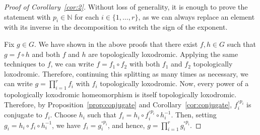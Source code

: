\documentclass[microtype]{gtpart}
\newcommand{\bn}{\mathbb N}
\theoremstyle{definition}
\numberwithin{equation}{section}
\begin{document}
\begin{proof}[Proof of Corollary~\ref{cor:2}]
Without loss of generality, it is enough to prove the statement with \( p_i \in \bn \) for each \( i \in \{1, \ldots, r\} \), as we can always replace an element with its inverse in the decomposition to switch the sign of the exponent. 

Fix \( g \in G \).
We have shown in the above proofs that there exist \( f, h \in G \) such that \( g = f\circ h \) and both \( f \) and \( h \) are topologically loxodromic. 
Applying the same techniques to \( f \), we can write \( f = f_1 \circ f_2 \) with both \( f_1 \) and \( f_2 \) topologically loxodromic. 
Therefore, continuing this splitting as many times as necessary, we can write \( g = \prod_{i=1}^r f_i \) with \( f_i \) topologically loxodromic. 
Now, every power of a topologically loxodromic homeomorphism is itself topologically loxodromic. 
Therefore, by Proposition~\ref{prop:conjugate} and Corollary~\ref{cor:conjugate}, \( f_i^{\circ p_i} \) is conjugate to \( f_i \). 
Choose \( h_i \) such that \( f_i = h_i \circ f_i^{\circ p_i} \circ h_i^{-1} \). 
Then, setting \( g_i  = h_i \circ f_i \circ h_i^{-1} \), we have \( f_i = g_i^{\circ p_i} \), and hence, \( g = \prod_{i=1}^r g_i^{\circ p_i} \). 
\end{proof}




\end{document}
